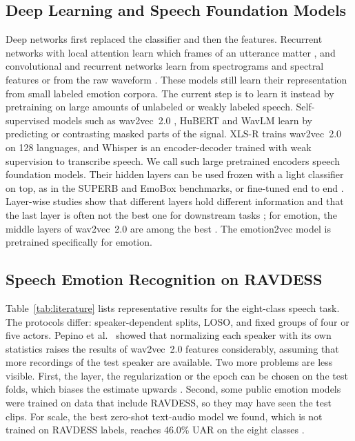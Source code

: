 \documentclass[journal]{IEEEtran}
\begin{document}
\subsection{Deep Learning and Speech Foundation Models}
Deep networks first replaced the classifier and then the features. Recurrent networks with local attention learn which frames of an utterance matter \cite{mirsamadi2017attention}, and convolutional and recurrent networks learn from spectrograms and spectral features \cite{zhao2019cnnlstm,issa2020cnn} or from the raw waveform \cite{trigeorgis2016adieu}. These models still learn their representation from small labeled emotion corpora. The current step is to learn it instead by pretraining on large amounts of unlabeled or weakly labeled speech. Self-supervised models such as wav2vec~2.0 \cite{baevski2020wav2vec}, HuBERT \cite{hsu2021hubert} and WavLM \cite{chen2022wavlm} learn by predicting or contrasting masked parts of the signal. XLS-R \cite{babu2022xlsr} trains wav2vec~2.0 on 128 languages, and Whisper \cite{radford2023whisper} is an encoder-decoder trained with weak supervision to transcribe speech. We call such large pretrained encoders speech foundation models. Their hidden layers can be used frozen with a light classifier on top, as in the SUPERB \cite{yang2021superb} and EmoBox \cite{ma2024emobox} benchmarks, or fine-tuned end to end \cite{wagner2023dawn}. Layer-wise studies show that different layers hold different information and that the last layer is often not the best one for downstream tasks \cite{pasad2021layerwise}; for emotion, the middle layers of wav2vec~2.0 are among the best \cite{li2022exploration}. The emotion2vec model \cite{ma2024emotion2vec} is pretrained specifically for emotion.

\subsection{Speech Emotion Recognition on RAVDESS}
Table~\ref{tab:literature} lists representative results for the eight-class speech task. The protocols differ: speaker-dependent splits, LOSO, and fixed groups of four or five actors. Pepino et al.\ \cite{pepino2021wav2vec} showed that normalizing each speaker with its own statistics raises the results of wav2vec~2.0 features considerably, assuming that more recordings of the test speaker are available. Two more problems are less visible. First, the layer, the regularization or the epoch can be chosen on the test folds, which biases the estimate upwards \cite{varma2006bias,cawley2010overfitting}. Second, some public emotion models were trained on data that include RAVDESS, so they may have seen the test clips. For scale, the best zero-shot text-audio model we found, which is not trained on RAVDESS labels, reaches 46.0\% UAR on the eight classes \cite{yang2026clsp}.
\end{document}
